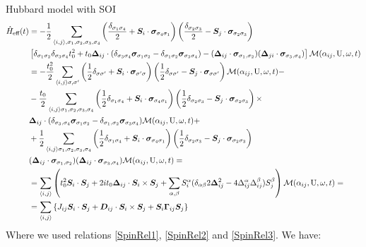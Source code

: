 \begin{section}{Hubbard model with SOI}
\begin{align*}
\hat{H}_{\text{eff}}(t) &= - \frac{1}{2} \sum_{\langle i,j \rangle, \sigma_1, \sigma_2, \sigma_3, \sigma_4} \left( \frac{\delta_{\sigma_1 \sigma_4}}{2} + \boldsymbol{S}_i\cdot\boldsymbol{\sigma}_{\sigma_4 \sigma_1} \right) \left( \frac{\delta_{\sigma_2 \sigma_3}}{2} - \boldsymbol{S}_j\cdot\boldsymbol{\sigma}_{\sigma_2 \sigma_3} \right) \nonumber \\ &\left[ \delta_{\sigma_1 \sigma_2}\delta_{\sigma_3 \sigma_4}t_0^2 + t_0\boldsymbol{\Delta}_{ij}\cdot(\delta_{\sigma_3 \sigma_4} \boldsymbol{\sigma}_{\sigma_1 \sigma_2} - \delta_{\sigma_1 \sigma_2} \boldsymbol{\sigma}_{\sigma_3 \sigma_4}) - (\boldsymbol{\Delta}_{ij}\cdot\boldsymbol{\sigma}_{\sigma_1, \sigma_2})(\boldsymbol{\Delta}_{ji}\cdot\boldsymbol{\sigma}_{\sigma_3, \sigma_4}) \right] \mathcal{M}(\alpha_{ij}, \text{U}, \omega, t) \\
&= -\frac{t_0^2}{2} \sum_{\langle i,j \rangle \sigma, \sigma'} \left(\frac{1}{2}\delta_{\sigma \sigma'} + \boldsymbol{S}_i\cdot\boldsymbol{\sigma}_{\sigma' \sigma}\right)\left(\frac{1}{2}\delta_{\sigma \sigma'}-\boldsymbol{S}_j\cdot\boldsymbol{\sigma}_{\sigma \sigma'}\right)\mathcal{M}(\alpha_{ij}, \text{U}, \omega, t) - \\
&- \frac{t_0}{2} \sum_{\langle i,j \rangle \sigma_1, \sigma_2, \sigma_3, \sigma_4} \left(\frac{1}{2}\delta_{\sigma_1 \sigma_4} + \boldsymbol{S}_i\cdot\boldsymbol{\sigma}_{\sigma_4 \sigma_1}\right)\left(\frac{1}{2}\delta_{\sigma_2 \sigma_3}-\boldsymbol{S}_j\cdot\boldsymbol{\sigma}_{\sigma_2 \sigma_3}\right) \times \\
&\boldsymbol{\Delta}_{ij}\cdot(\delta_{\sigma_3,\sigma_4}\boldsymbol{\sigma}_{\sigma_1 \sigma_2}-\delta_{\sigma_1,\sigma_2}\boldsymbol{\sigma}_{\sigma_3 \sigma_4})\mathcal{M}(\alpha_{ij}, \text{U}, \omega, t) + \\
&+\frac{1}{2}\sum_{\langle i,j \rangle \sigma_1, \sigma_2, \sigma_3, \sigma_4} \left(\frac{1}{2}\delta_{\sigma_1 \sigma_4} + \boldsymbol{S}_i\cdot\boldsymbol{\sigma}_{\sigma_4 \sigma_1}\right)\left(\frac{1}{2}\delta_{\sigma_2 \sigma_3}-\boldsymbol{S}_j\cdot\boldsymbol{\sigma}_{\sigma_2 \sigma_3}\right) \\
&(\boldsymbol{\Delta}_{ij}\cdot\boldsymbol{\sigma}_{\sigma_1, \sigma_2})(\boldsymbol{\Delta}_{ij}\cdot\boldsymbol{\sigma}_{\sigma_3, \sigma_4})\mathcal{M}(\alpha_{ij}, \text{U}, \omega, t) = \\
&= \sum_{\langle i,j \rangle} \left( t_0^2 \boldsymbol{S}_i\cdot\boldsymbol{S}_j + 2it_0\boldsymbol{\Delta}_{ij}\cdot \boldsymbol{S}_i \times \boldsymbol{S}_j + \sum_{\alpha, \beta} S_i^\alpha (\delta_{\alpha \beta} 2\boldsymbol{\Delta}_{ij}^2 - 4\Delta_{ij}^\alpha\Delta_{ij}^\beta ) S_j^\beta \right) \mathcal{M}(\alpha_{ij}, \text{U}, \omega, t) =\\
&= \sum_{\langle i,j \rangle} \left\{ J_{ij}\boldsymbol{S}_i\cdot\boldsymbol{S}_j +\boldsymbol{D}_{ij}\cdot\boldsymbol{S}_i \times \boldsymbol{S}_j + \boldsymbol{S}_i\boldsymbol{\Gamma}_{ij}\boldsymbol{S}_j \right\}
\end{align*}
Where we used relations \ref{SpinRel1}, \ref{SpinRel2} and \ref{SpinRel3}. We have:


\end{section}
